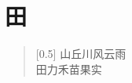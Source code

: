\documentclass[12pt,UTF-8,openany]{ctexbook}
\begin{document}
\hanzibox{}\hanzibox{}\hanzibox{}\hanzibox{}\hspace{1em}\hanzibox{}\hanzibox{}\hanzibox{}\hanzibox{}

\hanzibox{}\hanzibox{}\hanzibox{}\hanzibox{}\hspace{1em}\hanzibox{}\hanzibox{}\hanzibox{}\hanzibox{}






\chapter{田}

\begin{large}
    
    \begin{verse}[0.5\linewidth]
        山丘川风云雨 \\
        田力禾苗果实
    \end{verse}
    
\end{large}


\clearpage

\begin{center}
    
    
    
\end{center}


\hanzibox{}\hanzibox{}\hanzibox{}\hanzibox{}\hspace{1em}\hanzibox{}\hanzibox{}\hanzibox{}\hanzibox{}

\hanzibox{}\hanzibox{}\hanzibox{}\hanzibox{}\hspace{1em}\hanzibox{}\hanzibox{}\hanzibox{}\hanzibox{}

\hanzibox{}\hanzibox{}\hanzibox{}\hanzibox{}\hspace{1em}\hanzibox{}\hanzibox{}\hanzibox{}\hanzibox{}

\hanzibox{}\hanzibox{}\hanzibox{}\hanzibox{}\hspace{1em}\hanzibox{}\hanzibox{}\hanzibox{}\hanzibox{}

\hanzibox{}\hanzibox{}\hanzibox{}\hanzibox{}\hspace{1em}
\end{document}
